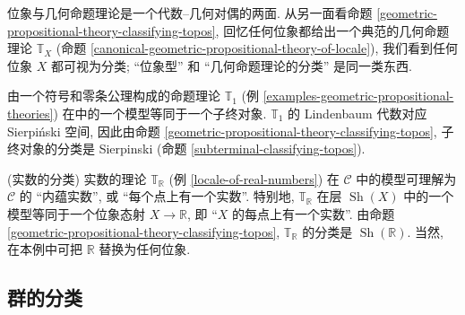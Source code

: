 \begin{remark}
	{}
	位象与几何命题理论是一个代数--几何对偶的两面. 从另一面看命题 \ref{geometric-propositional-theory-classifying-topos}, 回忆任何位象都给出一个典范的几何命题理论 $\mathbb T_X$ (命题 \ref{canonical-geometric-propositional-theory-of-locale}),
	我们看到任何位象 $X$ 都可视为分类\topos{}; ``位象型\topos{}'' 和 ``几何命题理论的分类\topos{}'' 是同一类东西.
\end{remark}

\begin{example}
	{}
	由一个符号和零条公理构成的命题理论 $\mathbb T_1$ (例 \ref{examples-geometric-propositional-theories}) 在\topos{}中的一个模型等同于一个子终对象. $\mathbb T_1$ 的 Lindenbaum 代数对应 Sierpi\'nski 空间, 因此由命题 \ref{geometric-propositional-theory-classifying-topos}, 子终对象的分类\topos{}是 Sierpinski \topos{} (命题 \ref{subterminal-classifying-topos}).
\end{example}

\begin{example}
	{(实数的分类\topos{})}
	实数的理论 $\mathbb T_{\mathbb R}$ (例 \ref{locale-of-real-numbers}) 在\topos{} $\mathcal C$ 中的模型可理解为 $\mathcal C$ 的 ``内蕴实数'', 或 ``每个点上有一个实数''. 特别地, $\mathbb T_{\mathbb R}$ 在层\topos{} $\operatorname{Sh}(X)$ 中的一个模型等同于一个位象态射 $X\to\mathbb R$, 即 ``$X$ 的每点上有一个实数''.
	由命题 \ref{geometric-propositional-theory-classifying-topos},
	$\mathbb T_{\mathbb R}$ 的分类\topos{}是 $\operatorname{Sh}(\mathbb R)$.
	当然, 在本例中可把 $\mathbb R$ 替换为任何位象.
\end{example}

\subsection{群的分类\topos{}}

%


